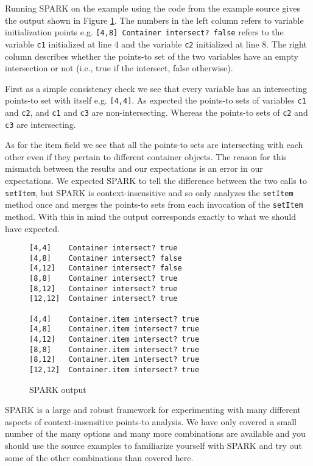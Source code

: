 \documentclass{article}
\newcommand{\code}[1]{\texttt{\small #1}}
\begin{document}
Running SPARK on the example using the code from the example source
gives the output shown in Figure \ref{fig:SPARK:output:test1}. The
numbers in the left column refers to variable initialization points
e.g. \code{[4,8] Container intersect?  false} refers to the variable
\code{c1} initialized at line 4 and the variable \code{c2} initialized
at line 8. The right column describes whether the points-to set of the
two variables have an empty intersection or not (i.e., true if the
intersect, false otherwise).

First as a simple consistency check we see that every variable has an
intersecting points-to set with itself e.g. \code{[4,4]}. As expected
the points-to sets of variables \code{c1} and \code{c2}, and \code{c1}
and \code{c3} are non-intersecting. Whereas the points-to sets of
\code{c2} and \code{c3} are intersecting.

As for the item field we see that all the points-to sets are
intersecting with each other even if they pertain to different
container objects. The reason for this mismatch between the results
and our expectations is an error in our expectations. We expected
SPARK to tell the difference between the two calls to \code{setItem},
but SPARK is context-insensitive and so only analyzes the
\code{setItem} method once and merges the points-to sets from each
invocation of the \code{setItem} method. With this in mind the output
corresponds exactly to what we should have expected.

\begin{figure}[htb]
  \centering
  \begin{verbatim}
[4,4]    Container intersect? true
[4,8]    Container intersect? false
[4,12]   Container intersect? false
[8,8]    Container intersect? true
[8,12]   Container intersect? true
[12,12]  Container intersect? true

[4,4]    Container.item intersect? true
[4,8]    Container.item intersect? true
[4,12]   Container.item intersect? true
[8,8]    Container.item intersect? true
[8,12]   Container.item intersect? true
[12,12]  Container.item intersect? true
  \end{verbatim}
  \caption{SPARK output}
  \label{fig:SPARK:output:test1}
\end{figure}



SPARK is a large and robust framework for experimenting with many
different aspects of context-insensitive points-to analysis. We have
only covered a small number of the many options and many more
combinations are available and you should use the source examples to
familiarize yourself with SPARK and try out some of the other
combinations than covered here.
\end{document}
